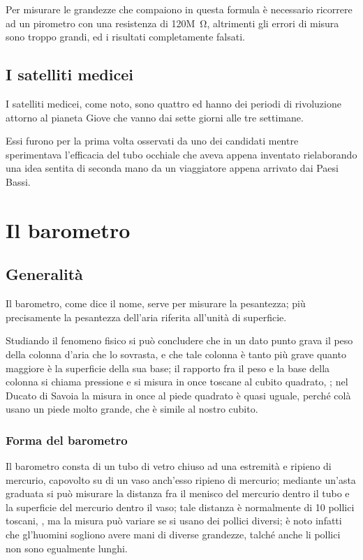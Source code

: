 \documentclass[b5paper,10pt,twoside,cucitura]{toptesi}
\begin{document}
Per misurare le grandezze che compaiono in questa formula {\`e} necessario
ricorrere ad un pirometro con una resistenza di 120\unit{M\ohm}, altrimenti gli
errori di misura sono troppo grandi, ed i risultati completamente falsati.

\section{I satelliti medicei}
I satelliti medicei, come noto, sono quattro ed hanno dei periodi di rivoluzione
attorno al pianeta Giove che vanno dai sette giorni alle tre settimane.

Essi furono per la prima volta osservati da uno dei candidati mentre
sperimentava l'efficacia del tubo occhiale che aveva appena inventato
rielaborando una idea sentita di seconda mano da un viaggiatore appena arrivato
dai Paesi Bassi.





\chapter{Il barometro}
\section{Generalit{\`a}}
\begin{interlinea}{0.87} Il barometro, come dice il nome, serve per
misurare la pesantezza; pi{\`u} precisamente la pesantezza dell'aria
riferita all'unit{\`a} di superficie.
\end{interlinea}

\begin{interlinea}{2} Studiando il fenomeno fisico si pu{\`o} concludere
che in un dato punto grava il peso della colonna d'aria che lo
sovrasta, e che tale colonna {\`e} tanto pi{\`u} grave quanto maggiore
{\`e} la superficie della sua base; il rapporto fra il peso e la base
della colonna si chiama pressione e si misura in once toscane al cubito
quadrato, \cite{tor1}; nel Ducato di Savoia la misura in once al piede
quadrato {\`e} quasi uguale, perch{\'e} col{\`a} usano un piede molto
grande, che {\`e} simile al nostro cubito.
\end{interlinea}

\subsection{Forma del barometro}
Il barometro consta di un tubo di vetro chiuso ad una estremit{\`a} e
ripieno di mercurio, capovolto su di un vaso anch'esso ripieno di
mercurio; mediante un'asta graduata si pu{\`o} misurare la distanza fra
il menisco del mercurio dentro il tubo e la superficie del mercurio
dentro il vaso; tale distanza {\`e} normalmente di 10 pollici toscani,
\cite{tor1,tor2}, ma la misura pu{\`o} variare se si usano dei pollici
diversi; {\`e} noto infatti che gl'huomini sogliono avere mani di
diverse grandezze, talch{\'e} anche li pollici non sono egualmente
lunghi.
\end{document}
